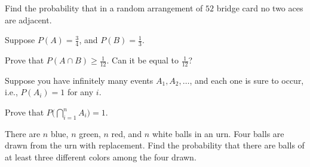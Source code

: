 \begin{problem}[Handout 2, \# 16]
  Find the probability that in a random arrangement of \(52\) bridge card
  no two aces are adjacent.
\end{problem}
\begin{solution*}
\end{solution*}

\begin{problem}[Handout 2, \# 17]
  Suppose \(P(A)=\frac{3}{4}\), and \(P(B)=\frac{1}{3}\).

  \noindent Prove that \(P(A\cap B)\geq \frac{1}{12}\). Can it be equal to
  \(\frac{1}{12}\)?
\end{problem}
\begin{solution*}
\end{solution*}

\begin{problem}[Handout 2, \# 18]
  Suppose you have infinitely many events \(A_1,A_2,\dotsc\), and each one
  is sure to occur, i.e., \(P(A_i)=1\) for any \(i\).

  \noindent Prove that \(P\bigl(\bigcap_{i=1}^n A_i\bigr)=1\).
\end{problem}
\begin{solution*}
\end{solution*}

\begin{problem}[Handout 2, \# 19]
  There are \(n\) blue, \(n\) green, \(n\) red, and \(n\) white balls in an
  urn. Four balls are drawn from the urn with replacement. Find the
  probability that there are balls of at least three different colors among
  the four drawn.
\end{problem}
\begin{solution*}
\end{solution*}

